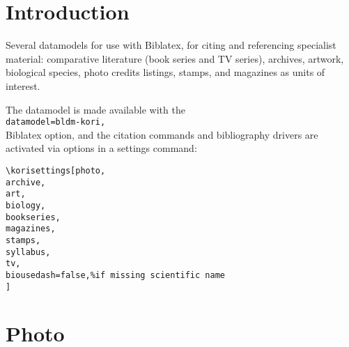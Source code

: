 %
\korisettings[photo,
archive,
art,
biology,
bookseries,
magazines,
stamps,
syllabus,
tv,
biousedash=false,
]



\newcommand{\cmm}[1]{{\large\ttfamily\color{blue}\textbackslash#1}}

\newcommand{\cmmp}[1]{\cmm{#1}\par\medskip}

\newcommand{\cmmq}[2]{{\large\ttfamily\color{blue}\textbackslash#1} = \csname #1\endcsname{#2}}

\newcommand{\cmmr}[2]{\textcolor{\cmmhlcolour}{\cmmq{#1}{#2}}}


\newcommand{\cmmhlcolour}{red}

\newcommand{\cmmhl}[1]{{\color{\cmmhlcolour}#1}}


\newcommand\showcmnd[1]{%
\textbackslash\texttt{#1}%
}

\newcommand\showcmnda[1]{%
@\texttt{#1}%
}

\newcommand\cmma[1]{\showcmnda{#1}}
\newcommand\ddivider{\noindent{\color{blue!80}\rule{\textwidth}{7pt}}}


\section{Introduction}
Several datamodels for use with Biblatex, for citing and referencing specialist material: comparative literature (book series and TV series), archives, artwork, biological species, photo credits listings, stamps, and magazines as units of interest.

The datamodel is made available with the \\
\verb|datamodel=bldm-kori,| \\
Biblatex option, and the citation commands and bibliography drivers are activated via options in a settings command:

\begin{verbatim}
\korisettings[photo,
archive,
art,
biology,
bookseries,
magazines,
stamps,
syllabus,
tv,
biousedash=false,%if missing scientific name
]
\end{verbatim}





\section{Photo}

